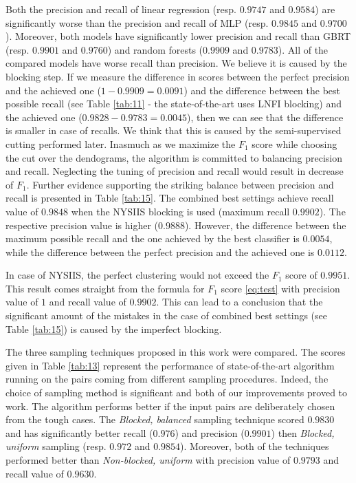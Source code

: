 \documentclass{pracamgr}
\begin{document}
Both the precision and recall of linear regression (resp. $0.9747$ and $0.9584$) are
significantly worse than the precision and recall of MLP
(resp. $0.9845$ and $0.9700$). Moreover, both models have significantly lower
precision and recall than GBRT (resp. $0.9901$
and $0.9760$) and random forests ($0.9909$ and $0.9783$). All of the compared
models have worse recall than precision. We believe it is caused by the blocking
step. If we measure the difference in scores between the perfect precision
and the achieved one ($1 - 0.9909 = 0.0091$) and the difference between the best
possible recall (see Table \ref{tab:11} - the state-of-the-art uses LNFI blocking)
and the achieved one ($0.9828 - 0.9783 = 0.0045$), then we can see that the difference
is smaller in case of recalls. We think that this is caused by the semi-supervised
cutting performed later. Inasmuch as we maximize the $F_{1}$ score while choosing the cut
over the dendograms, the algorithm is committed to balancing precision and recall.
Neglecting the tuning of precision and recall would result in decrease of $F_{1}$.
Further evidence supporting the striking balance between precision and recall is
presented in Table \ref{tab:15}. The combined best settings achieve recall value
of $0.9848$ when the NYSIIS blocking is used (maximum recall $0.9902$). The respective
precision value is higher ($0.9888$). However, the difference between the maximum
possible recall and the one achieved by the best classifier is $0.0054$, while the difference between the
perfect precision and the achieved one is $0.0112$.

In case of NYSIIS, the perfect clustering would not exceed the $F_{1}$ score of $0.9951$.
This result comes straight from the formula for $F_{1}$ score \eqref{eq:test} with precision value
of $1$ and recall value of $0.9902$. This can lead to a conclusion that the significant
amount of the mistakes in the case of combined best settings (see Table \ref{tab:15}) is caused
by the imperfect blocking.


The three sampling techniques proposed in this work were compared. The scores given in Table
\ref{tab:13} represent the performance of state-of-the-art algorithm running on the
pairs coming from different sampling procedures. Indeed, the choice of sampling
method is significant and both of our improvements proved to work. The algorithm
performs better if the input pairs are deliberately chosen from the tough cases.
The \textit{Blocked, balanced} sampling technique scored $0.9830$ and has
significantly better recall ($0.976$) and precision ($0.9901$) then \textit{Blocked,
uniform} sampling (resp. $0.972$ and $0.9854$). Moreover, both of the techniques
performed better than \textit{Non-blocked, uniform} with precision value of $0.9793$
and recall value of $0.9630$.
\end{document}
